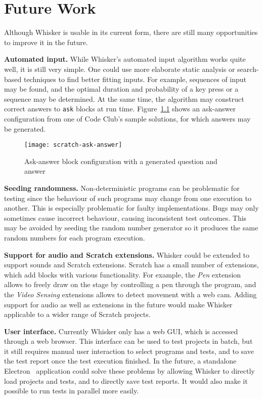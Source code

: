 \chapter{Future Work}
\label{cha:future_work}

Although Whisker is usable in its current form,
there are still many opportunities to improve it in the future.
\parspace

\textbf{Automated input.}
While Whisker's automated input algorithm works quite well, it is still very simple.
One could use more elaborate static analysis or search-based techniques to find better fitting inputs.
For example, sequences of input may be found, and the optimal duration and probability of a key press or a sequence may be determined.
At the same time, the algorithm may construct correct answers to \texttt{ask} blocks at run time.
Figure~\ref{fig:generated_ask_answer} shows an ask-answer configuration from one of Code Club's sample solutions,
for which answers may be generated.

\begin{figure}[htpb]
    \centering
    \texttt{[image: scratch-ask-answer]}
    \caption{Ask-answer block configuration with a generated question and answer}
    \label{fig:generated_ask_answer}
\end{figure}

\textbf{Seeding randomness.}
Non-deterministic programs can be problematic for testing since the behaviour of such programs may change from one execution to another.
This is especially problematic for faulty implementations.
Bugs may only sometimes cause incorrect behaviour, causing inconsistent test outcomes.
This may be avoided by seeding the random number generator so it produces the same random numbers for each program execution.
\parspace

\textbf{Support for audio and Scratch extensions.}
Whisker could be extended to support sounds and Scratch extensions.
Scratch has a small number of extensions, which add blocks with various functionality.
For example, the \textit{Pen} extension allows to freely draw on the stage by controlling a pen through the program,
and the \textit{Video Sensing} extensions allows to detect movement with a web cam.
Adding support for audio as well as extensions in the future would make Whisker applicable to a wider range of Scratch projects.
\parspace

\textbf{User interface.}
Currently Whisker only has a web GUI, which is accessed through a web browser.
This interface can be used to test projects in batch, but it still requires manual user interaction to select programs and tests,
and to save the test report once the test execution finished.
In the future, a standalone Electron~\cite{electron} application could solve these problems by allowing Whisker to directly load projects and tests,
and to directly save test reports.
It would also make it possible to run tests in parallel more easily.
\parspace

